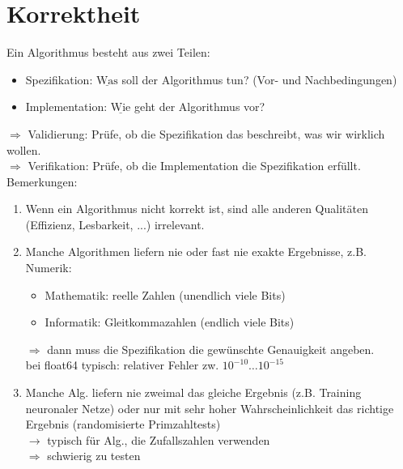 
\chapter{Korrektheit}

Ein Algorithmus besteht aus zwei Teilen:
\begin{itemize}
    \item Spezifikation: $\underline{\text{Was}}$ soll der Algorithmus tun? (Vor- und Nachbedingungen)
    \item Implementation: $\underline{\text{Wie}}$ geht der Algorithmus vor?
\end{itemize}
$\Rightarrow$ Validierung: Prüfe, ob die Spezifikation das beschreibt, was wir wirklich wollen. \\
$\Rightarrow$ Verifikation: Prüfe, ob die Implementation die Spezifikation erfüllt. \\

Bemerkungen:
\begin{enumerate}
    \item Wenn ein Algorithmus nicht korrekt ist, sind alle anderen Qualitäten (Effizienz, Lesbarkeit, ...) irrelevant.
    \item Manche Algorithmen liefern nie oder fast nie exakte Ergebnisse, z.B. Numerik:
    \begin{itemize}
        \item Mathematik: reelle Zahlen (unendlich viele Bits)
        \item Informatik: Gleitkommazahlen (endlich viele Bits)
    \end{itemize}
    $\Rightarrow$ dann muss die Spezifikation die gewünschte Genauigkeit angeben. \\
    bei float64 typisch: relativer Fehler zw. $10^{-10} \dots 10^{-15}$
    \item Manche Alg. liefern nie zweimal das gleiche Ergebnis (z.B. Training neuronaler Netze) oder nur mit sehr hoher Wahrscheinlichkeit das richtige Ergebnis (randomisierte Primzahltests)\\
    $\rightarrow$ typisch für Alg., die Zufallszahlen verwenden \\
    $\Rightarrow$ schwierig zu testen
\end{enumerate}

